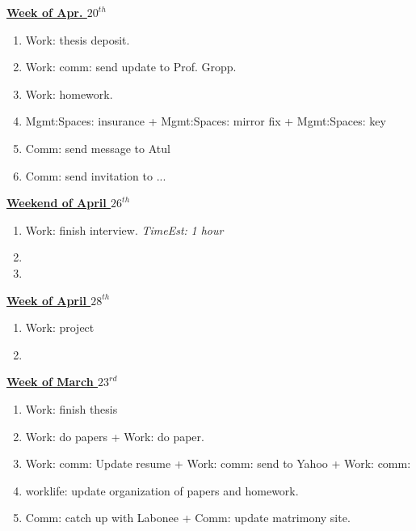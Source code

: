 \documentclass[11pt]{article}
\newcommand{\te}[1]{\textit{TimeEst:} \textit{#1}}
\begin{document}
{\small \underline{\textbf{Week of Apr. $20^{th}$}} }\\
\begin{enumerate} 
\item \small Work: thesis deposit. 
\item \small Work: comm: send update to Prof. Gropp.  
\item \small Work: homework. 
\item \small Mgmt:Spaces: insurance  + Mgmt:Spaces: mirror fix +
  Mgmt:Spaces: key
\item \small Comm: send message to Atul
\item \small Comm: send invitation to ...
\end{enumerate} 

{\small \underline{\textbf{Weekend of April $26^{th}$}}}\\
\begin{enumerate} 
  \small \item \small Work: finish interview. \te{1 hour} 
\item \small 
\item \small 
\end{enumerate} 

{\small \underline{\textbf{Week of April $28^{th}$}}}\\  
\begin{enumerate} 
  \small \item \small Work: project 
\item \small 
\end{enumerate} 

{\small \underline{\textbf{Week of March $23^{rd}$}}}\\  
\begin{enumerate} 
  \small \item \small Work: finish thesis 
  \small \item \small Work: do papers + Work: do paper. 
  \small \item \small Work: comm: Update resume  + Work: comm: send to
  Yahoo + Work: comm: 
\item \small worklife: update organization of papers and homework. 
\item \small Comm: catch up with Labonee + Comm: update matrimony
  site. 
\end{enumerate}
\end{document}
